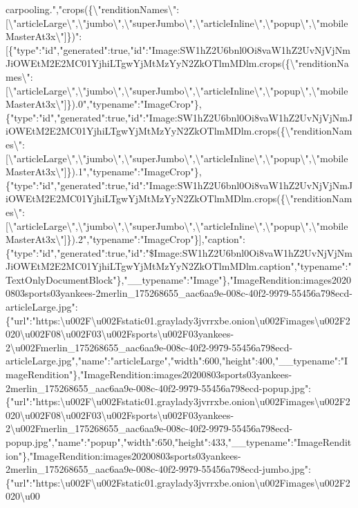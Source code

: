 carpooling.","crops(\{\textbackslash{}"renditionNames\textbackslash{}":{[}\textbackslash{}"articleLarge\textbackslash{}",\textbackslash{}"jumbo\textbackslash{}",\textbackslash{}"superJumbo\textbackslash{}",\textbackslash{}"articleInline\textbackslash{}",\textbackslash{}"popup\textbackslash{}",\textbackslash{}"mobileMasterAt3x\textbackslash{}"{]}\})":{[}\{"type":"id","generated":true,"id":"Image:SW1hZ2U6bnl0Oi8vaW1hZ2UvNjVjNmJiOWEtM2E2MC01YjhiLTgwYjMtMzYyN2ZkOTlmMDlm.crops(\{\textbackslash{}"renditionNames\textbackslash{}":{[}\textbackslash{}"articleLarge\textbackslash{}",\textbackslash{}"jumbo\textbackslash{}",\textbackslash{}"superJumbo\textbackslash{}",\textbackslash{}"articleInline\textbackslash{}",\textbackslash{}"popup\textbackslash{}",\textbackslash{}"mobileMasterAt3x\textbackslash{}"{]}\}).0","typename":"ImageCrop"\},\{"type":"id","generated":true,"id":"Image:SW1hZ2U6bnl0Oi8vaW1hZ2UvNjVjNmJiOWEtM2E2MC01YjhiLTgwYjMtMzYyN2ZkOTlmMDlm.crops(\{\textbackslash{}"renditionNames\textbackslash{}":{[}\textbackslash{}"articleLarge\textbackslash{}",\textbackslash{}"jumbo\textbackslash{}",\textbackslash{}"superJumbo\textbackslash{}",\textbackslash{}"articleInline\textbackslash{}",\textbackslash{}"popup\textbackslash{}",\textbackslash{}"mobileMasterAt3x\textbackslash{}"{]}\}).1","typename":"ImageCrop"\},\{"type":"id","generated":true,"id":"Image:SW1hZ2U6bnl0Oi8vaW1hZ2UvNjVjNmJiOWEtM2E2MC01YjhiLTgwYjMtMzYyN2ZkOTlmMDlm.crops(\{\textbackslash{}"renditionNames\textbackslash{}":{[}\textbackslash{}"articleLarge\textbackslash{}",\textbackslash{}"jumbo\textbackslash{}",\textbackslash{}"superJumbo\textbackslash{}",\textbackslash{}"articleInline\textbackslash{}",\textbackslash{}"popup\textbackslash{}",\textbackslash{}"mobileMasterAt3x\textbackslash{}"{]}\}).2","typename":"ImageCrop"\}{]},"caption":\{"type":"id","generated":true,"id":"\$Image:SW1hZ2U6bnl0Oi8vaW1hZ2UvNjVjNmJiOWEtM2E2MC01YjhiLTgwYjMtMzYyN2ZkOTlmMDlm.caption","typename":"TextOnlyDocumentBlock"\},"\_\_typename":"Image"\},"ImageRendition:images20200803sports03yankees-2merlin\_175268655\_aac6aa9e-008c-40f2-9979-55456a798ecd-articleLarge.jpg":\{"url":"https:\textbackslash{}u002F\textbackslash{}u002Fstatic01.graylady3jvrrxbe.onion\textbackslash{}u002Fimages\textbackslash{}u002F2020\textbackslash{}u002F08\textbackslash{}u002F03\textbackslash{}u002Fsports\textbackslash{}u002F03yankees-2\textbackslash{}u002Fmerlin\_175268655\_aac6aa9e-008c-40f2-9979-55456a798ecd-articleLarge.jpg","name":"articleLarge","width":600,"height":400,"\_\_typename":"ImageRendition"\},"ImageRendition:images20200803sports03yankees-2merlin\_175268655\_aac6aa9e-008c-40f2-9979-55456a798ecd-popup.jpg":\{"url":"https:\textbackslash{}u002F\textbackslash{}u002Fstatic01.graylady3jvrrxbe.onion\textbackslash{}u002Fimages\textbackslash{}u002F2020\textbackslash{}u002F08\textbackslash{}u002F03\textbackslash{}u002Fsports\textbackslash{}u002F03yankees-2\textbackslash{}u002Fmerlin\_175268655\_aac6aa9e-008c-40f2-9979-55456a798ecd-popup.jpg","name":"popup","width":650,"height":433,"\_\_typename":"ImageRendition"\},"ImageRendition:images20200803sports03yankees-2merlin\_175268655\_aac6aa9e-008c-40f2-9979-55456a798ecd-jumbo.jpg":\{"url":"https:\textbackslash{}u002F\textbackslash{}u002Fstatic01.graylady3jvrrxbe.onion\textbackslash{}u002Fimages\textbackslash{}u002F2020\textbackslash{}u00